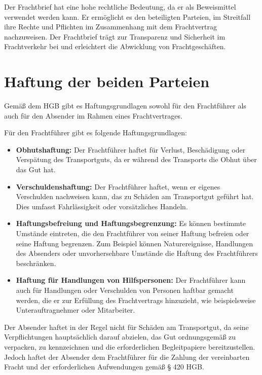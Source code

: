 Der Frachtbrief hat eine hohe rechtliche Bedeutung, da er als Beweismittel verwendet werden kann. Er ermöglicht es den beteiligten Parteien, im Streitfall ihre Rechte und Pflichten im Zusammenhang mit dem Frachtvertrag nachzuweisen. Der Frachtbrief trägt zur Transparenz und Sicherheit im Frachtverkehr bei und erleichtert die Abwicklung von Frachtgeschäften.

\section{Haftung der beiden Parteien}
Gemäß dem HGB gibt es Haftungsgrundlagen sowohl für den Frachtführer als auch für den Absender im Rahmen eines Frachtvertrages.

Für den Frachtführer gibt es folgende Haftungsgrundlagen:
\begin{itemize}
    \item \textbf{Obhutshaftung:} Der Frachtführer haftet für Verlust, Beschädigung oder Verspätung des Transportguts, da er während des Transports die Obhut über das Gut hat.
    \item \textbf{Verschuldenshaftung:} Der Frachtführer haftet, wenn er eigenes Verschulden nachweisen kann, das zu Schäden am Transportgut geführt hat. Dies umfasst Fahrlässigkeit oder vorsätzliches Handeln.
    \item \textbf{Haftungsbefreiung und Haftungsbegrenzung:} Es können bestimmte Umstände eintreten, die den Frachtführer von seiner Haftung befreien oder seine Haftung begrenzen. Zum Beispiel können Naturereignisse, Handlungen des Absenders oder unvorhersehbare Umstände die Haftung des Frachtführers beschränken.
    \item \textbf{Haftung für Handlungen von Hilfspersonen:} Der Frachtführer kann auch für Handlungen oder Verschulden von Personen haftbar gemacht werden, die er zur Erfüllung des Frachtvertrags hinzuzieht, wie beispielsweise Unterauftragnehmer oder Mitarbeiter.
\end{itemize}

Der Absender haftet in der Regel nicht für Schäden am Transportgut, da seine Verpflichtungen hauptsächlich darauf abzielen, das Gut ordnungsgemäß zu verpacken, zu kennzeichnen und die erforderlichen Begleitpapiere bereitzustellen. Jedoch haftet der Absender dem Frachtführer für die Zahlung der vereinbarten Fracht und der erforderlichen Aufwendungen gemäß § 420 \ac{HGB}.